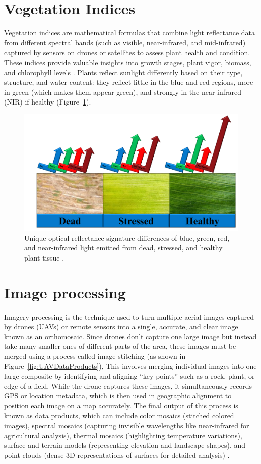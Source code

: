 \section{Vegetation Indices}
Vegetation indices are mathematical formulas that combine light reflectance data from different spectral bands (such as visible, near-infrared, and mid-infrared) captured by sensors on drones or satellites to assess plant health and condition. These indices provide valuable insights into growth stages, plant vigor, biomass, and chlorophyll levels \parencite{sishodia2020applications}. Plants reflect sunlight differently based on their type, structure, and water content: they reflect little in the blue and red regions, more in green (which makes them appear green), and strongly in the near-infrared (NIR) if healthy (Figure~\ref{fig:bluegreenred}). 

\begin{figure}[H]
    \centering
    \includegraphics[width=0.8
    \textwidth]{chapters/chapter3/images/Figure05.png}
    \caption{Unique optical reflectance signature differences of blue, green, red, and near-infrared light emitted from dead, stressed, and healthy plant tissue \protect\parencite{olson2021review}.}
    \label{fig:bluegreenred}
\end{figure}

\section{Image processing}

Imagery processing is the technique used to turn multiple aerial images captured by drones (UAVs) or remote sensors into a single, accurate, and clear image known as an orthomosaic. Since drones don’t capture one large image but instead take many smaller ones of different parts of the area, these images must be merged using a process called image stitching  (as shown in Figure~\ref{fig:UAVDataProducts}), This involves merging individual images into one large composite by identifying and aligning “key points” such as a rock, plant, or edge of a field. While the drone captures these images, it simultaneously records GPS or location metadata, which is then used in geographic alignment to position each image on a map accurately. The final output of this process is known as data products, which can include color mosaics (stitched colored images), spectral mosaics (capturing invisible wavelengths like near-infrared for agricultural analysis), thermal mosaics (highlighting temperature variations), surface and terrain models (representing elevation and landscape shapes), and point clouds (dense 3D representations of surfaces for detailed analysis) \parencite{olson2021review}.

